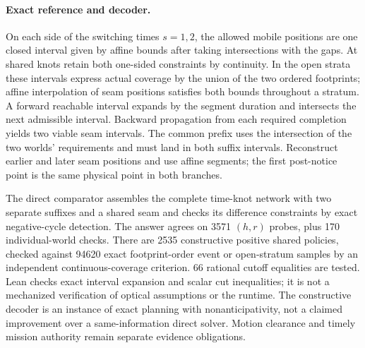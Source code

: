 \documentclass[11pt]{article}
\begin{document}
\paragraph{Exact reference and decoder.}
On each side of the switching times \(s=1,2\), the allowed mobile
positions are one closed interval given by affine bounds after
taking intersections with the gaps. At shared knots retain both
one-sided constraints by continuity. In the open strata these
intervals express actual coverage by the union of the two
ordered footprints; affine interpolation of seam positions
satisfies both bounds throughout a stratum.
A forward reachable interval expands by the segment duration
and intersects the next admissible interval. Backward propagation
from each required completion yields two viable seam intervals.
The common prefix uses the intersection of the two worlds'
requirements and must land in both suffix intervals.
Reconstruct earlier and later seam positions and use affine
segments; the first post-notice point is the same physical point
in both branches.

The direct comparator assembles the complete time-knot network
with two separate suffixes and a shared seam and checks its
difference constraints by exact negative-cycle detection. The
answer agrees on 3571 \((h,r)\) probes, plus 170 individual-world
checks. There are 2535 constructive positive shared policies,
checked against 94620 exact footprint-order event or open-stratum
samples by an independent continuous-coverage criterion.
66 rational cutoff equalities are tested. Lean checks exact
interval expansion and scalar cut inequalities; it is not a
mechanized verification of optical assumptions or the runtime.
The constructive decoder is an instance of exact planning with
nonanticipativity, not a claimed improvement over a
same-information direct solver. Motion clearance and timely
mission authority remain separate evidence obligations.
\end{document}
